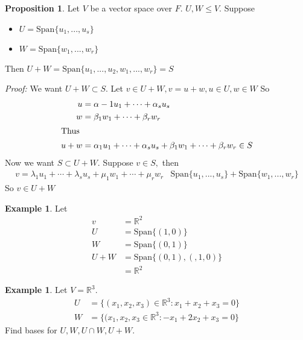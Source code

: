 \documentclass{report}
\theoremstyle{remark}
\theoremstyle{definition}
\theoremstyle{definition}
\newtheorem{example}[theorem]{Example}
\theoremstyle{theorem}
\newtheorem{proposition}[theorem]{Proposition}
\begin{document}
\begin{proposition}
Let $V$ be a vector space over $F$. $U, W \leq V$. Suppose
\begin{itemize}
    \item $U = \text{Span} \{u_1, ..., u_s\}$
    \item $W = \text{Span}\{w_1,...,w_r\}$
\end{itemize}
Then $U+W = \text{Span}\{u_1,...,u_2,w_1,...,w_r\} = S$
\end{proposition}
\emph{Proof:} We want $U+W \subset S$. Let $v \in U+W, v=u+w, u \in U, w \in W$ So
\begin{align*}
    u&= \alpha-1u_1+\cdots +\alpha_su_s\\
    w&=\beta_1w_1 + \cdots + \beta_rw_r\\
    \intertext{Thus}
    u+w&= \alpha_1u_1 + \cdots + \alpha_su_s + \beta_1w_1 + \cdots + \beta_rw_r \in S
\end{align*}
Now we want $S \subset U+W$. Suppose $v \in S,$ then 
\begin{align*}
    v = \lambda_1u_1 + \cdots + \lambda_su_s + \mu_1w_1 + \cdots + \mu_rw_r
    & \text{Span}\{u_1,...,u_s\} + \text{Span}\{w_1,...,w_r\}
\end{align*}
So $v \in U+W$
\begin{example}
Let \begin{align*}
    v&=\mathbb{R}^2\\
    U&=\text{Span}\{(1,0)\}\\
    W&=\text{Span}\{(0,1)\}\\
    U+W&=\text{Span}\{(0,1),(,1,0)\}\\
    &= \mathbb{R}^2
\end{align*}
\end{example}
\begin{example}
Let $V = \mathbb{R}^3$.
\begin{align*}
    U &= \{(x_1,x_2,x_3) \in \mathbb{R}^3: x_1 + x_2 + x_3 =0\}\\
    W &= \{(x_1, x_2, x_3 \in \mathbb{R}^3: -x_1 +2x_2 + x_3 =0\}
\end{align*}
Find bases for $U, W, U\cap W, U + W$.
\end{example}
\end{document}
